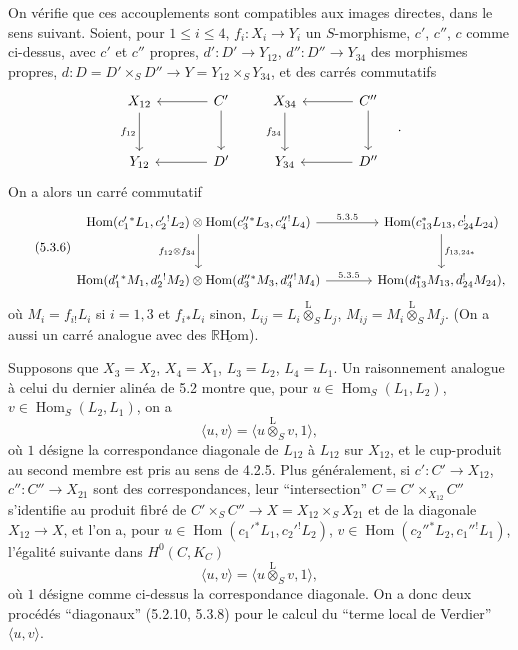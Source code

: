 \documentclass[11pt]{article}
\DeclareMathOperator{\Hom}{Hom}
\newcommand{\R}{\mathbb{R}}\newcommand{\RHomCore}{\mathbb{R}\mathrm{Hom}}
\providecommand{\RHom}{\RHomCore}
\providecommand{\uRHom}{\underline{\RHom}}
\providecommand{\RHom}{\RHomCore}
\providecommand{\Hom}{\operatorname{Hom}}
\providecommand{\RHom}{\R\mathcal{H}om}
\providecommand{\R}{\mathrm R}
\providecommand{\RHom}{\RHomCore}
\providecommand{\Hom}{\operatorname{Hom}}
\begin{document}
On vérifie que ces accouplements sont compatibles aux images directes, dans le sens suivant. Soient, pour $1\leq i\leq4$, $f_i:X_i\to Y_i$ un $S$-morphisme, $c'$, $c''$, $c$ comme ci-dessus, avec $c'$ et $c''$ propres, $d':D'\to Y_{12}$, $d'':D''\to Y_{34}$ des morphismes propres, $d:D=D'\times_SD''\to Y=Y_{12}\times_SY_{34}$, et des carrés commutatifs
\[
\begin{tikzcd}[column sep=large,row sep=large]
X_{12} \arrow[d,"f_{12}"'] & C' \arrow[l] \arrow[d] \\
Y_{12} & D' \arrow[l]
\end{tikzcd}
\qquad
\begin{tikzcd}[column sep=large,row sep=large]
X_{34} \arrow[d,"f_{34}"'] & C'' \arrow[l] \arrow[d] \\
Y_{34} & D'' \arrow[l]
\end{tikzcd}\quad .
\]
On a alors un carré commutatif
\begin{equation}
\tag{5.3.6}
\begin{tikzcd}[column sep=large,row sep=large]
\Hom(c_1'{}^*L_1,c_2'{}^!L_2)\otimes\Hom(c_3''{}^*L_3,c_4''{}^!L_4) \arrow[r,"5.3.5"] \arrow[d,"f_{12}\otimes f_{34}"']
& \Hom(c_{13}^*L_{13},c_{24}^!L_{24}) \arrow[d,"f_{13,24*}"] \\
\Hom(d_1'{}^*M_1,d_2'{}^!M_2)\otimes\Hom(d_3''{}^*M_3,d_4''{}^!M_4) \arrow[r,"5.3.5"]
& \Hom(d_{13}^*M_{13},d_{24}^!M_{24}),
\end{tikzcd}
\end{equation}
où $M_i=f_{i!}L_i$ si $i=1,3$ et $f_i{}_*L_i$ sinon, $L_{ij}=L_i\overset{\mathrm{L}}{\otimes}_SL_j$, $M_{ij}=M_i\overset{\mathrm{L}}{\otimes}_SM_j$. (On a aussi un carré analogue avec des $\uRHom$).

Supposons que $X_3=X_2$, $X_4=X_1$, $L_3=L_2$, $L_4=L_1$. Un raisonnement analogue à celui du dernier alinéa de 5.2 montre que, pour $u\in\Hom_S(L_1,L_2)$, $v\in\Hom_S(L_2,L_1)$, on a
\begin{equation}
\tag{5.3.7}
\langle u,v\rangle=\langle u\overset{\mathrm{L}}{\otimes}_Sv,1\rangle,
\end{equation}
où $1$ désigne la correspondance diagonale de $L_{12}$ à $L_{12}$ sur $X_{12}$, et le cup-produit au second membre est pris au sens de 4.2.5. Plus généralement, si $c':C'\to X_{12}$, $c'':C''\to X_{21}$ sont des correspondances, leur ``intersection'' $C=C'\times_{X_{12}}C''$ s'identifie au produit fibré de $C'\times_SC''\to X=X_{12}\times_SX_{21}$ et de la diagonale $X_{12}\to X$, et l'on a, pour $u\in\Hom(c_1'{}^*L_1,c_2'{}^!L_2)$, $v\in\Hom(c_2''{}^*L_2,c_1''{}^!L_1)$, l'égalité suivante dans $H^0(C,K_C)$
\begin{equation}
\tag{5.3.8}
\langle u,v\rangle=\langle u\overset{\mathrm{L}}{\otimes}_Sv,1\rangle,
\end{equation}
où $1$ désigne comme ci-dessus la correspondance diagonale. On a donc deux procédés ``diagonaux'' (5.2.10, 5.3.8) pour le calcul du ``terme local de Verdier'' $\langle u,v\rangle$.
\end{document}
